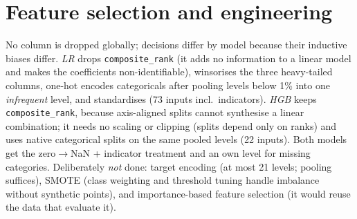 \documentclass[10pt]{article}
\begin{document}
\section{Feature selection and engineering}
No column is dropped globally; decisions differ by model because their inductive biases differ. \emph{LR} drops \texttt{composite\_rank} (it adds no information to a linear model and makes the coefficients non-identifiable), winsorises the three heavy-tailed columns, one-hot encodes categoricals after pooling levels below 1\% into one \emph{infrequent} level, and standardises (73 inputs incl.\ indicators). \emph{HGB} keeps \texttt{composite\_rank}, because axis-aligned splits cannot synthesise a linear combination; it needs no scaling or clipping (splits depend only on ranks) and uses native categorical splits on the same pooled levels (22 inputs). Both models get the zero$\to$NaN + indicator treatment and an own level for missing categories. Deliberately \emph{not} done: target encoding (at most 21 levels; pooling suffices), SMOTE (class weighting and threshold tuning handle imbalance without synthetic points), and importance-based feature selection (it would reuse the data that evaluate it).
\end{document}
